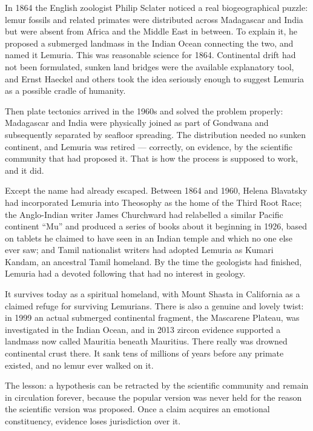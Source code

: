 In 1864 the English zoologist Philip Sclater noticed a real biogeographical puzzle: lemur fossils and
related primates were distributed across Madagascar and India but were absent from Africa and the
Middle East in between. To explain it, he proposed a submerged landmass in the Indian Ocean
connecting the two, and named it Lemuria. This was reasonable science for 1864. Continental drift had
not been formulated, sunken land bridges were the available explanatory tool, and Ernst Haeckel and
others took the idea seriously enough to suggest Lemuria as a possible cradle of humanity.

Then plate tectonics arrived in the 1960s and solved the problem properly: Madagascar and India were
physically joined as part of Gondwana and subsequently separated by seafloor spreading. The
distribution needed no sunken continent, and Lemuria was retired --- correctly, on evidence, by the
scientific community that had proposed it. That is how the process is supposed to work, and it did.

Except the name had already escaped. Between 1864 and 1960, Helena Blavatsky had incorporated Lemuria
into Theosophy as the home of the Third Root Race; the Anglo-Indian writer James Churchward had
relabelled a similar Pacific continent ``Mu'' and produced a series of books about it beginning in
1926, based on tablets he claimed to have seen in an Indian temple and which no one else ever saw; and
Tamil nationalist writers had adopted Lemuria as Kumari Kandam, an ancestral Tamil homeland. By the
time the geologists had finished, Lemuria had a devoted following that had no interest in geology.

It survives today as a spiritual homeland, with Mount Shasta in California as a claimed refuge for
surviving Lemurians. There is also a genuine and lovely twist: in 1999 an actual submerged
continental fragment, the Mascarene Plateau, was investigated in the Indian Ocean, and in 2013
zircon evidence supported a landmass now called Mauritia beneath Mauritius. There really was drowned
continental crust there. It sank tens of millions of years before any primate existed, and no lemur
ever walked on it.

The lesson: a hypothesis can be retracted by the scientific community and remain in circulation
forever, because the popular version was never held for the reason the scientific version was
proposed. Once a claim acquires an emotional constituency, evidence loses jurisdiction over it.

